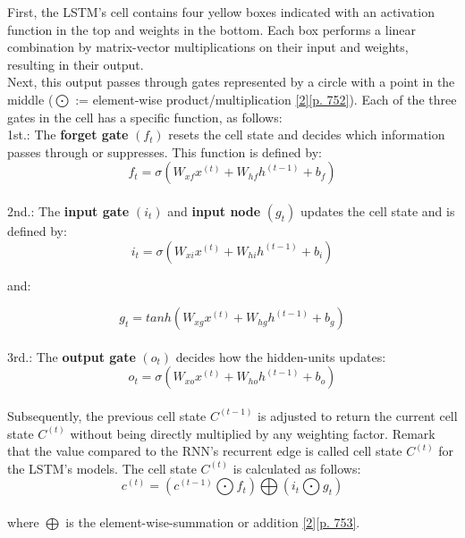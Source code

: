 First, the LSTM's cell contains four yellow boxes indicated with an activation function in the top and weights in the bottom. Each box performs a linear combination by matrix-vector multiplications on their input and weights, resulting in their output.\\

Next, this output passes through gates represented by a circle with a point in the middle ($\bigodot$ := element-wise product/multiplication \hyperref[Bib:Sebastian Raschka, Vahid Mirjalili]{[2][p. 752]}). Each of the three gates in the cell has a specific function, as follows:\\

1st.: The \textbf{forget gate} $(f_t)$ resets the cell state and decides which information passes through or suppresses. This function is defined by:\\

$$f_t = \sigma(W_{xf} x^{(t)} + W_{hf} h^{(t-1)} + b_f)$$\\

2nd.: The \textbf{input gate} $(i_t)$ and \textbf{input node} $(g_t)$ updates the cell state and is defined by:\\

$$i_t = \sigma(W_{xi} x^{(t)} + W_{hi} h^{(t-1)} + b_i)$$

\noindent and:

$$g_t = tanh(W_{xg} x^{(t)} + W_{hg} h^{(t-1)} + b_g)$$\\

3rd.: The \textbf{output gate} $(o_t)$ decides how the hidden-units updates:\\

$$o_t = \sigma(W_{xo} x^{(t)} + W_{ho} h^{(t-1)} + b_o)$$\\

Subsequently, the previous cell state $C^{(t-1)}$ is adjusted to return the current cell state $C^{(t)}$ without being directly multiplied by any weighting factor. Remark that the value compared to the RNN's recurrent edge is called cell state $C^{(t)}$ for the LSTM's models. The cell state $C^{(t)}$ is calculated as follows:\\

$$c^{(t)} = (c^{(t-1)} \bigodot f_t) \bigoplus (i_t \bigodot g_t)$$\\

\noindent where $\bigoplus$ is the element-wise-summation or addition \hyperref[Bib:Sebastian Raschka, Vahid Mirjalili]{[2][p. 753]}.\\

